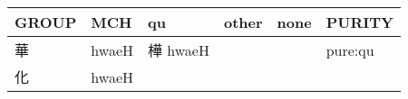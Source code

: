 \documentclass[14pt,a4paper]{scrartcl}
\begin{document}
\begin{longtable}[c]{@{}llllll@{}}
\toprule
\begin{minipage}[b]{0.14\columnwidth}\raggedright\strut
GROUP
\strut\end{minipage} &
\begin{minipage}[b]{0.14\columnwidth}\raggedright\strut
MCH
\strut\end{minipage} &
\begin{minipage}[b]{0.14\columnwidth}\raggedright\strut
qu
\strut\end{minipage} &
\begin{minipage}[b]{0.14\columnwidth}\raggedright\strut
other
\strut\end{minipage} &
\begin{minipage}[b]{0.14\columnwidth}\raggedright\strut
none
\strut\end{minipage} &
\begin{minipage}[b]{0.14\columnwidth}\raggedright\strut
PURITY
\strut\end{minipage}\tabularnewline
\midrule
\endhead
\begin{minipage}[t]{0.14\columnwidth}\raggedright\strut
華
\strut\end{minipage} &
\begin{minipage}[t]{0.14\columnwidth}\raggedright\strut
hwaeH
\strut\end{minipage} &
\begin{minipage}[t]{0.14\columnwidth}\raggedright\strut
樺 hwaeH
\strut\end{minipage} &
\begin{minipage}[t]{0.14\columnwidth}\raggedright\strut
\strut\end{minipage} &
\begin{minipage}[t]{0.14\columnwidth}\raggedright\strut
\strut\end{minipage} &
\begin{minipage}[t]{0.14\columnwidth}\raggedright\strut
pure:qu
\strut\end{minipage}\tabularnewline
\begin{minipage}[t]{0.14\columnwidth}\raggedright\strut
化
\strut\end{minipage} &
\begin{minipage}[t]{0.14\columnwidth}\raggedright\strut
hwaeH
\strut\end{minipage} &
\begin{minipage}[t]{0.14\columnwidth}\raggedright\strut
\strut\end{minipage} &
\begin{minipage}[t]{0.14\columnwidth}\raggedright\strut

\end{minipage}
\end{longtable}
\end{document}
